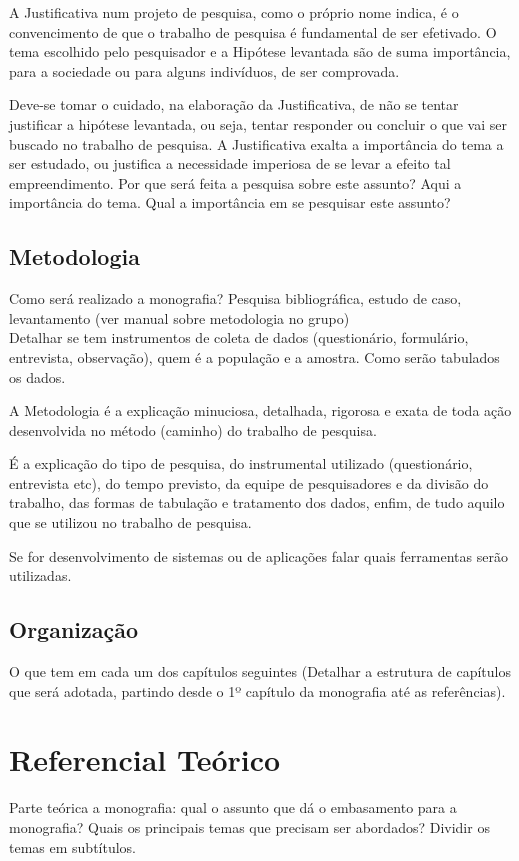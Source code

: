\documentclass[
    12pt,				       %
    openright,			       %
    oneside,			       %
    a4paper,			       %
    chapter=TITLE,             %
    sumario=tradicional,       %
    english,			        %
    brazil, 				    %
 ]{abntex2}
\begin{document}
A Justificativa num projeto de pesquisa, como o próprio nome indica, é o convencimento de que o trabalho de pesquisa é fundamental de ser efetivado. O tema escolhido pelo pesquisador e a Hipótese levantada são de suma importância, para a sociedade ou para alguns indivíduos, de ser comprovada.

Deve-se tomar o cuidado, na elaboração da Justificativa, de não se tentar justificar a hipótese levantada, ou seja, tentar responder ou concluir o que vai ser buscado no trabalho de pesquisa. A Justificativa exalta a importância do tema a ser estudado, ou justifica a necessidade imperiosa de se levar a efeito tal empreendimento.
Por que será feita a pesquisa sobre este assunto? Aqui a importância do tema. Qual a importância em se pesquisar este assunto?


\section{Metodologia}\label{sec:Metodologia}
Como será realizado a monografia? Pesquisa bibliográfica, estudo de caso, levantamento (ver manual sobre metodologia no grupo) \\
Detalhar se tem instrumentos de coleta de dados (questionário, formulário, entrevista, observação), quem é a população e a amostra. Como serão tabulados os dados.

A Metodologia é a explicação minuciosa, detalhada, rigorosa e exata de toda ação desenvolvida no método (caminho) do trabalho de pesquisa.

É a explicação do tipo de pesquisa, do instrumental utilizado (questionário, entrevista etc), do tempo previsto, da equipe de pesquisadores e da divisão do trabalho, das formas de tabulação e tratamento dos dados, enfim, de tudo aquilo que se utilizou no trabalho de pesquisa.

Se for desenvolvimento de sistemas ou de aplicações falar quais ferramentas serão utilizadas.


\section{Organização}\label{sec:Organizacao}
O que tem em cada um dos capítulos seguintes (Detalhar a estrutura de capítulos que será adotada, partindo desde o 1º capítulo da monografia até as referências).

\chapter{Referencial Teórico}\label{sec:RefTeorico}
Parte teórica a monografia: qual o assunto que dá o embasamento para a monografia? Quais os principais temas que precisam ser abordados? Dividir os temas em subtítulos.
\end{document}
